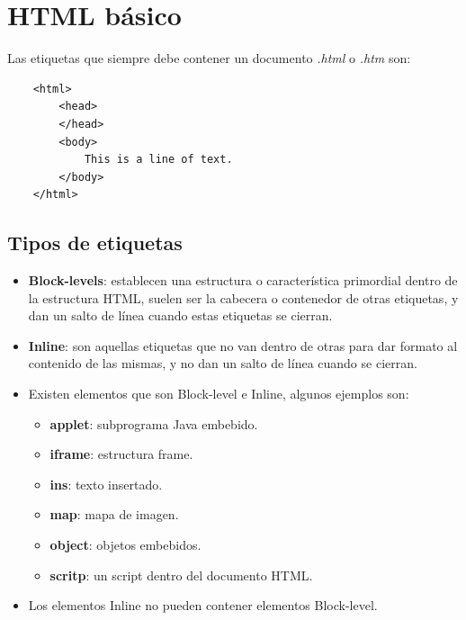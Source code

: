 \section{HTML básico}

Las etiquetas que siempre debe contener un documento \textit{.html} o \textit{.htm} son:
\begin{lstlisting}
    <html>
        <head>
        </head>
        <body>
            This is a line of text.
        </body>
    </html>
\end{lstlisting}


\subsection{Tipos de etiquetas}
\begin{itemize}
    \item \textbf{Block-levels}: establecen una estructura o característica primordial dentro de la estructura HTML, suelen ser la cabecera o contenedor de otras etiquetas, y dan un salto de línea cuando estas etiquetas se cierran.
    \item \textbf{Inline}: son aquellas etiquetas que no van dentro de otras para dar formato al contenido de las mismas, y no dan un salto de línea cuando se cierran.
    \item Existen elementos que son Block-level e Inline, algunos ejemplos son:
    \begin{itemize}
        \item \textbf{applet}: subprograma Java embebido.
        \item \textbf{iframe}: estructura frame.
        \item \textbf{ins}: texto insertado.
        \item \textbf{map}: mapa de imagen.
        \item \textbf{object}: objetos embebidos.
        \item \textbf{scritp}: un script dentro del documento HTML.
    \end{itemize}
    \item Los elementos Inline no pueden contener elementos Block-level.
\end{itemize}


